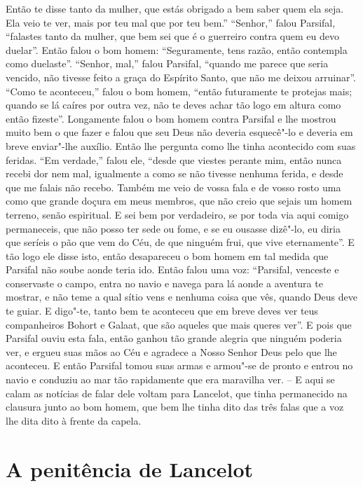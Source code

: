 Então te disse tanto da mulher, que estás obrigado a bem saber quem ela
seja. Ela veio te ver, mais por teu mal que por teu bem.” “Senhor,” falou
Parsifal, “falastes tanto da mulher, que bem sei que é o guerreiro contra quem
eu devo duelar”. Então falou o bom homem: “Seguramente, tens razão, então
contempla como duelaste”. “Senhor, mal,” falou Parsifal, “quando me parece que
seria vencido, não tivesse feito a graça do Espírito Santo, que não me deixou
arruinar”. “Como te aconteceu,” falou o bom homem, “então futuramente te
protejas mais; quando se lá caíres por outra vez, não te deves achar tão logo
em altura como então fizeste”. Longamente falou o bom homem contra Parsifal e
lhe mostrou muito bem o que fazer e falou que seu Deus não deveria esquecê"-lo e
deveria em breve enviar"-lhe auxílio. Então lhe pergunta como lhe tinha
acontecido com suas feridas. “Em verdade,” falou ele, “desde que viestes
perante mim, então nunca recebi dor nem mal, igualmente a como se não tivesse
nenhuma ferida, e desde que me falais não recebo. Também me veio de vossa fala
e de vosso rosto uma como que grande doçura em meus membros, que não creio que
sejais um homem terreno, senão espiritual. E sei bem por verdadeiro, se por
toda via aqui comigo permaneceis, que não posso ter sede ou fome, e se eu
ousasse dizê"-lo, eu diria que seríeis o pão que vem do Céu, de que ninguém
frui, que vive eternamente”. E tão logo ele disse isto, então desapareceu o bom
homem em tal medida que Parsifal não soube aonde teria ido. Então falou uma
voz: “Parsifal, venceste e conservaste o campo, entra no navio e navega para
lá aonde a aventura te mostrar, e não teme a qual sítio vens e nenhuma coisa
que vês, quando Deus deve te guiar. E digo"-te, tanto bem te aconteceu que em
breve deves ver teus companheiros Bohort e Galaat, que são aqueles que mais
queres ver”. E pois que Parsifal ouviu esta fala, então
ganhou tão grande alegria que ninguém poderia ver, e ergueu suas mãos ao Céu e
agradece a Nosso Senhor Deus pelo que lhe aconteceu. E então Parsifal tomou
suas armas e armou"-se de pronto e entrou no navio e conduziu ao mar tão
rapidamente que era maravilha ver. – E aqui se calam as notícias de falar dele
voltam para Lancelot, que tinha permanecido na clausura junto ao bom homem,
que bem lhe tinha dito das três falas que a voz lhe dita dito à frente da
capela. 

\chapter{A penitência de Lancelot}

